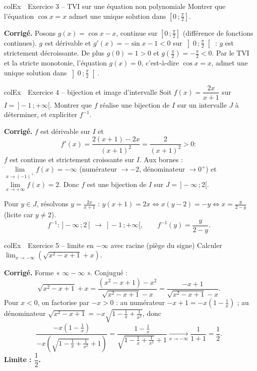 \documentclass[11pt,a4paper]{article}
\newenvironment{exemple}[1][Exemple]
  {\begin{fiche}{colEx}{\ding{217}~~#1}}{\end{fiche}}
\begin{document}
\begin{exemple}[Exercice 3 -- TVI sur une équation non polynomiale]
Montrer que l'équation $\cos x = x$ admet une unique solution dans $\left[0\,;\frac{\pi}{2}\right]$.

\smallskip
\textbf{Corrigé.} Posons $g(x) = \cos x - x$, continue sur $\left[0\,;\frac{\pi}{2}\right]$ (différence de fonctions continues). $g$ est dérivable et $g'(x) = -\sin x - 1 < 0$ sur $\left]0\,;\frac{\pi}{2}\right[$ : $g$ est strictement décroissante. De plus $g(0) = 1 > 0$ et $g\!\left(\frac{\pi}{2}\right) = -\frac{\pi}{2} < 0$. Par le TVI et la stricte monotonie, l'équation $g(x) = 0$, c'est-à-dire $\cos x = x$, admet une unique solution dans $\left]0\,;\frac{\pi}{2}\right[$.
\end{exemple}

\begin{exemple}[Exercice 4 -- bijection et image d'intervalle]
Soit $f(x) = \dfrac{2x}{x + 1}$ sur $I = \,]-1\,;+\infty[$. Montrer que $f$ réalise une bijection de $I$ sur un intervalle $J$ à déterminer, et expliciter $f^{-1}$.

\smallskip
\textbf{Corrigé.} $f$ est dérivable sur $I$ et
\[
  f'(x) = \frac{2(x + 1) - 2x}{(x + 1)^2} = \frac{2}{(x + 1)^2} > 0 :
\]
$f$ est continue et strictement croissante sur $I$. Aux bornes : $\lim\limits_{x \to (-1)^+} f(x) = -\infty$ (numérateur $\to -2$, dénominateur $\to 0^+$) et $\lim\limits_{x \to +\infty} f(x) = 2$. Donc $f$ est une bijection de $I$ sur $J = \,]-\infty\,;2[$.

\smallskip
Pour $y \in J$, résolvons $y = \frac{2x}{x+1}$ : $y(x + 1) = 2x \iff x(y - 2) = -y \iff x = \frac{y}{2 - y}$ (licite car $y \neq 2$).
\[
  f^{-1} : \,]-\infty\,;2[\ \to\ ]-1\,;+\infty[, \qquad f^{-1}(y) = \frac{y}{2 - y}.
\]
\end{exemple}

\begin{exemple}[Exercice 5 -- limite en $-\infty$ avec racine (piège du signe)]
Calculer $\displaystyle\lim_{x \to -\infty} \left(\sqrt{x^2 - x + 1} + x\right)$.

\smallskip
\textbf{Corrigé.} Forme « $\infty - \infty$ ». Conjugué :
\[
  \sqrt{x^2 - x + 1} + x = \frac{(x^2 - x + 1) - x^2}{\sqrt{x^2 - x + 1} - x}
  = \frac{-x + 1}{\sqrt{x^2 - x + 1} - x}.
\]
Pour $x < 0$, on factorise par $-x > 0$ : au numérateur $-x + 1 = -x\left(1 - \frac{1}{x}\right)$ ; au dénominateur $\sqrt{x^2 - x + 1} = -x\sqrt{1 - \frac{1}{x} + \frac{1}{x^2}}$, donc
\[
  \frac{-x\left(1 - \frac{1}{x}\right)}{-x\left(\sqrt{1 - \frac{1}{x} + \frac{1}{x^2}} + 1\right)}
  = \frac{1 - \frac{1}{x}}{\sqrt{1 - \frac{1}{x} + \frac{1}{x^2}} + 1}
  \xrightarrow[x \to -\infty]{} \frac{1}{1 + 1} = \frac{1}{2}.
\]
\textbf{Limite : $\dfrac{1}{2}$.}
\end{exemple}
\end{document}
